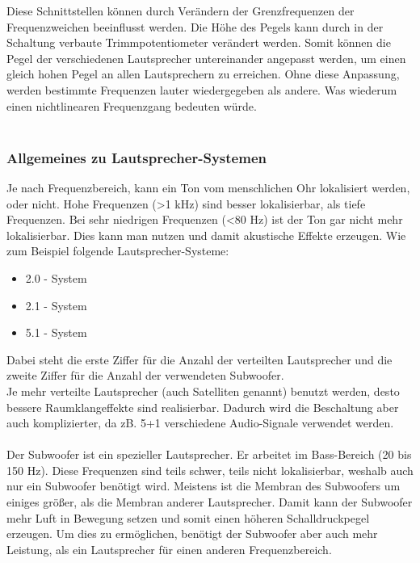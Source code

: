 
Diese Schnittstellen können durch Verändern der Grenzfrequenzen der Frequenzweichen beeinflusst werden.
Die Höhe des Pegels kann durch in der Schaltung verbaute Trimmpotentiometer verändert werden.
Somit können die Pegel der verschiedenen Lautsprecher untereinander angepasst werden, um einen gleich hohen Pegel an allen Lautsprechern zu erreichen.
Ohne diese Anpassung, werden bestimmte Frequenzen lauter wiedergegeben als andere.
Was wiederum einen nichtlinearen Frequenzgang bedeuten würde.\\ \\

\subsubsection*{Allgemeines zu Lautsprecher-Systemen}
Je nach Frequenzbereich, kann ein Ton vom menschlichen Ohr lokalisiert \mbox{werden}, oder nicht.
Hohe Frequenzen (>1 kHz) sind besser lokalisierbar, als tiefe Frequenzen.
Bei sehr niedrigen Frequenzen (<80 Hz) ist der Ton gar nicht mehr lokalisierbar. %
Dies kann man nutzen und damit akustische Effekte erzeugen.
Wie zum Beispiel folgende Lautsprecher-Systeme:
\begin{itemize}
	\item 2.0 - System
	\item 2.1 - System
	\item 5.1 - System
\end{itemize}
Dabei steht die erste Ziffer für die Anzahl der verteilten Lautsprecher und die zweite Ziffer für die Anzahl der verwendeten Subwoofer.
\\
Je mehr verteilte Lautsprecher (auch Satelliten genannt) benutzt werden, desto bessere Raumklangeffekte sind realisierbar.
Dadurch wird die Beschaltung aber auch komplizierter, da zB. 5+1 verschiedene Audio-Signale verwendet werden.
\\ \\
Der Subwoofer ist ein spezieller Lautsprecher.
Er arbeitet im Bass-Bereich (20 bis 150 Hz).
Diese Frequenzen sind teils schwer, teils nicht lokalisierbar, weshalb auch nur ein Subwoofer benötigt wird.
Meistens ist die Membran des Subwoofers um einiges größer, als die Membran anderer Lautsprecher.
Damit kann der Subwoofer mehr Luft in Bewegung setzen und somit einen höheren Schalldruckpegel erzeugen.
Um dies zu ermöglichen, benötigt der Subwoofer aber auch mehr Leistung, als ein Lautsprecher für einen anderen Frequenzbereich.
\\ \\

